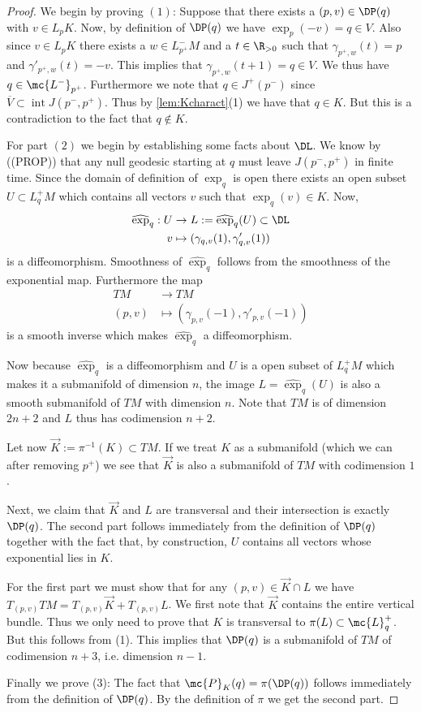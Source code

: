\begin{proof}
We begin by proving $(1)$: Suppose that there exists a $(p,v) \in \DP(q)$ with $v\in L_pK$. Now, by definition of $\DP(q)$ we have $\exp_p(-v) = q\in V$. Also since $v\in L_pK$ there exists a $w\in L^-_{p^+}M$ and a $t\in \R_{>0}$ such that $\gamma_{p^+,w}(t) = p$ and $\gamma'_{p^+,w}(t) = -v$. This implies that $\gamma_{p^+,w}(t+1) = q \in V$. We thus have $q \in \mc{L^-}_{p^+}$. Furthermore we note that $q\in J^+(p^-)$ since $\overline{V}\subset \operatorname{int}J(p^-,p^+)$.
Thus by \ref{lem:Kcharact}(1) we have that $q\in K$. But this is a contradiction to the fact that $q\notin K$.

For part $(2)$ we begin by establishing some facts about $\DL$. We know by ((PROP)) that any null geodesic starting at $q$ must leave $J(p^-,p^+)$ in finite time. Since the domain of definition of $\exp_q$ is open there exists an open subset $U\subset L^+_qM$ which contains all vectors $v$ such that $\exp_q(v)\in K$. Now, 
\begin{align*}
    \widehat{\exp}_q: U &\to L:=\widehat{\exp}_q(U) \subset \DL \\
    v &\mapsto (\gamma_{q,v}(1),\gamma'_{q,v}(1))
\end{align*}
is a diffeomorphism. Smoothness of $\widehat{\exp}_q$ follows from the smoothness of the exponential map. Furthermore the map
\begin{align*}
    TM &\to TM \\
    (p,v) &\mapsto (\gamma_{p,v}(-1),\gamma'_{p,v}(-1))
\end{align*}
is a smooth inverse which makes $\widehat{\exp}_q$ a diffeomorphism.

Now because $\widehat{\exp}_q$ is a diffeomorphism and $U$ is a open subset of $L^+_qM$ which makes it a submanifold of dimension $n$, the image $L=\widehat{\exp}_q(U)$ is also a smooth submanifold of $TM$ with dimension $n$. Note that $TM$ is of dimension $2n+2$ and $L$ thus has codimension $n+2$.

Let now $\overrightarrow{K}:=\pi^{-1}(K)\subset TM$. If we treat $K$ as a submanifold (which we can after removing $p^+$) we see that $\overrightarrow{K}$ is also a submanifold of $TM$ with codimension $1$.

Next, we claim that $\overrightarrow{K}$ and $L$ are transversal and their intersection is exactly $\DP(q)$. The second part follows immediately from the definition of $\DP(q)$ together with the fact that, by construction, $U$ contains all vectors whose exponential lies in $K$. 

For the first part we must show that for any $(p,v)\in \overrightarrow{K} \cap L$ we have $T_{(p,v)}TM = T_{(p,v)}\overrightarrow{K} + T_{(p,v)}L$. 
We first note that $\overrightarrow{K}$ contains the entire vertical bundle. Thus we only need to prove that $K$ is transversal to $\pi(L)\subset \mc{L}^+_q$. But this follows from (1). This implies that $\DP(q)$ is a submanifold of $TM$ of codimension $n+3$, i.e. dimension $n-1$.

Finally we prove (3): The fact that $\mc{P}_K(q) = \pi( \DP(q))$ follows immediately from the definition of $\DP(q)$. By the definition of $\pi$ we get the second part.
\end{proof}

